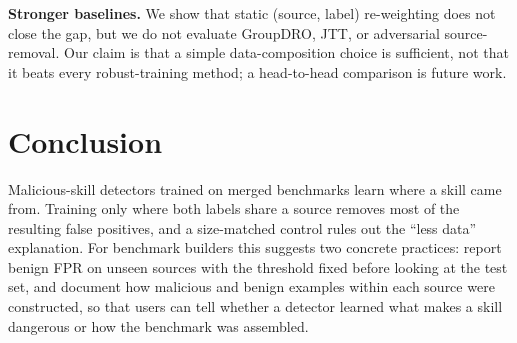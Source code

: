 \textbf{Stronger baselines.} We show that static (source, label) re-weighting does not close the gap,
but we do not evaluate GroupDRO, JTT, or adversarial source-removal. Our claim is that a simple
data-composition choice is sufficient, not that it beats every robust-training method; a head-to-head
comparison is future work.

\section{Conclusion}
\label{sec:conclusion}
Malicious-skill detectors trained on merged benchmarks learn where a skill came from. Training only where both
labels share a source removes most of the resulting false positives, and a size-matched control rules out the
``less data'' explanation. \ConclusionMechanism{} For benchmark builders this suggests two concrete practices:
report benign FPR on unseen sources with the threshold fixed before looking at the test set, and document how
malicious and benign examples within each source were constructed, so that users can tell whether a detector
learned what makes a skill dangerous or how the benchmark was assembled.
